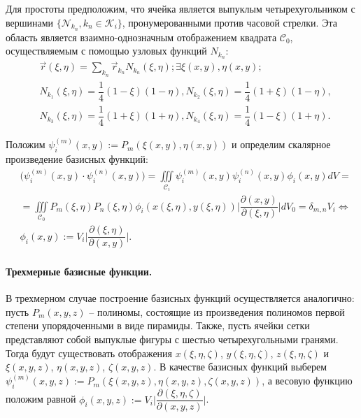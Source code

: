 \documentclass[14pt, a4paper, fleqn]{extreport}
\begin{document}
    Для простоты предположим, что ячейка является выпуклым четырехугольником
    с вершинами $\Big\lbrace \mathcal{N}_{k_n}, k_n \in \mathcal{K}_i \Big\rbrace$, 
    пронумерованными против часовой стрелки.
    Эта область является взаимно-однозначным отображением квадрата $\mathcal{C}_0$, 
    осуществляемым с помощью узловых функций $N_{k_n}$:
    \begin{equation*}
    \begin{split}
        &\vec{r}(\xi,\eta) = \sum\limits_{k_n} \vec{r}_{k_n} N_{k_n}(\xi, \eta); \exists \xi(x,y), \eta(x,y);
        \\
        &N_{k_1}(\xi,\eta) = \dfrac{1}{4}(1 - \xi)(1 - \eta), N_{k_2}(\xi, \eta) = \dfrac{1}{4}(1 + \xi)(1 - \eta), \\
        &N_{k_3}(\xi,\eta) = \dfrac{1}{4}(1 + \xi)(1 + \eta), N_{k_4}(\xi, \eta) = \dfrac{1}{4}(1 - \xi)(1 + \eta).
    \end{split}
    \end{equation*}
    
    Положим $\psi_i^{(m)}(x,y) := P_m(\xi(x,y),\eta(x,y))$ и
    определим скалярное произведение базисных функций:
    \begin{equation*}
    \begin{split}
        &\Big( \psi_i^{(m)}(x,y) \cdot \psi_i^{(n)}(x,y) \Big)
            = \iiint\limits_{\mathcal{C}_i} \psi_i^{(m)}(x,y) \psi_i^{(n)}(x,y) \phi_i(x,y) dV = \\
        &   = \iiint\limits_{\mathcal{C}_0} P_m(\xi,\eta) P_n(\xi,\eta) \phi_i(x(\xi,\eta),y(\xi,\eta)) 
                \Big|\dfrac{\partial(x,y)}{\partial(\xi,\eta)}\Big| dV_0
            = \delta_{m,n} V_i \Leftrightarrow \\
        &\phi_i(x,y) := V_i\Big|\dfrac{\partial(\xi,\eta)}{\partial(x,y)}\Big|.
    \end{split}
    \end{equation*}
    
    \paragraph{Трехмерные базисные функции.}
    В трехмерном случае построение базисных функций осуществляется аналогично:
    пусть $P_m(x,y,z)$ -- полиномы, состоящие из произведения полиномов
    первой степени упорядоченными в виде пирамиды.
    Также, пусть ячейки сетки представляют собой выпуклые фигуры с шестью
    четырехугольными гранями.
    Тогда будут существовать отображения 
    $x(\xi,\eta,\zeta)$, $y(\xi,\eta,\zeta)$, $z(\xi,\eta,\zeta)$ и
    $\xi(x,y,z)$, $\eta(x,y,z)$, $\zeta(x,y,z)$.
    В качестве базисных функций выберем 
    $\psi_i^{(m)}(x,y,z) := P_m(\xi(x,y,z),\eta(x,y,z),\zeta(x,y,z))$, 
    а весовую функцию положим равной 
    $\phi_i(x,y,z) := V_i\Big|\dfrac{\partial(\xi,\eta,\zeta)}{\partial(x,y,z)}\Big|$.
    
\end{document}
